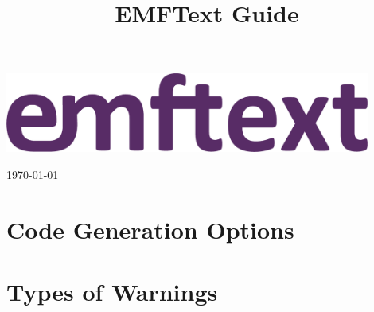 \documentclass[smallheadings,headsepline,pointlessnumbers,11pt,a4paper]{scrbook}
\title{EMFText Guide}
\newcommand{\changefont}[3]{\fontfamily{#1} \fontseries{#2} \fontshape{#3} \selectfont}
\let\origdoublepage\cleardoublepage
\renewcommand{\cleardoublepage}{%
  \clearpage{\pagestyle{empty}\origdoublepage}}
\begin{document}
\begin{titlepage}

\hbox{}
\vspace{4cm}

\begin{center}

\includegraphics[width=0.9\textwidth]{../latex/figures/EMFTextLogo.png}


\vspace{3cm}
{
\fontsize{40}{40}
\changefont{phv}{m}{n}{User Guide}
}
\end{center}

\vspace{7cm}
\begin{flushright}
\large
\today
\end{flushright}

\end{titlepage}

\cleardoublepage

\tableofcontents

\mainmatter





\renewcommand{\listfigurename}{List of Figures}
\listoffigures
\cleardoublepage

\renewcommand{\lstlistlistingname}{List of Listings\vspace{3mm}}
\lstlistoflistings
\cleardoublepage

\begin{appendix}
\chapter{Code Generation Options}
\label{app:options}


\chapter{Types of Warnings}
\label{app:warnings}

\end{appendix}


\end{document}
